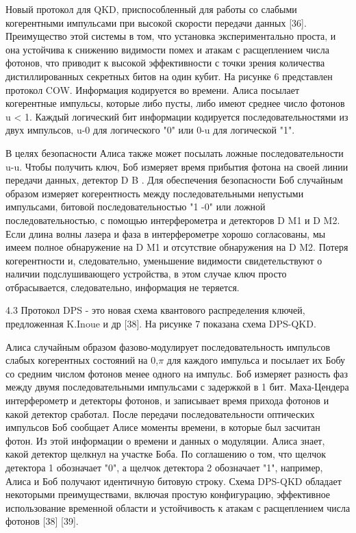 Новый протокол для QKD, приспособленный для работы со слабыми когерентными импульсами при высокой скорости передачи данных [36]. Преимущество этой системы в том, что установка экспериментально проста, и она устойчива к снижению видимости помех и атакам с расщеплением числа фотонов, что приводит к высокой эффективности с точки зрения количества дистиллированных секретных битов на один кубит. На рисунке 6 представлен протокол COW. Информация кодируется во времени. Алиса посылает когерентные импульсы, которые либо пусты, либо имеют среднее число фотонов u < 1. Каждый логический бит информации кодируется последовательностями из двух импульсов, u-0 для логического "0" или 0-u для логической "1".

В целях безопасности Алиса также может посылать ложные последовательности u-u. Чтобы получить ключ, Боб измеряет время прибытия фотона на своей линии передачи данных, детектор D B . Для обеспечения безопасности Боб случайным образом измеряет когерентность между последовательными непустыми импульсами, битовой последовательностью "1 -0" или ложной последовательностью, с помощью интерферометра и детекторов D M1 и D M2. Если длина волны лазера и фаза в интерферометре хорошо согласованы, мы имеем полное обнаружение на D M1 и отсутствие обнаружения на D M2. Потеря когерентности и, следовательно, уменьшение видимости свидетельствуют о наличии подслушивающего устройства, в этом случае ключ просто отбрасывается, следовательно, информация не теряется.

4.3 Протокол DPS - это новая схема квантового распределения ключей, предложенная K.Inoue и др [38]. На рисунке 7 показана схема DPS-QKD.

Алиса случайным образом фазово-модулирует последовательность импульсов слабых когерентных состояний на {0,$\pi$} для каждого импульса и посылает их Бобу со средним числом фотонов менее одного на импульс. Боб измеряет разность фаз между двумя последовательными импульсами с задержкой в 1 бит. Маха-Цендера интерферометр и детекторы фотонов, и записывает время прихода фотонов и какой детектор сработал. После передачи последовательности оптических импульсов Боб сообщает Алисе моменты времени, в которые был засчитан фотон. Из этой информации о времени и данных о модуляции. Алиса знает, какой детектор щелкнул на участке Боба. По соглашению о том, что щелчок детектора 1 обозначает "0", а щелчок детектора 2 обозначает "1", например, Алиса и Боб получают идентичную битовую строку.
Схема DPS-QKD обладает некоторыми преимуществами, включая простую конфигурацию, эффективное использование временной области и устойчивость к атакам с расщеплением числа фотонов [38] [39].

